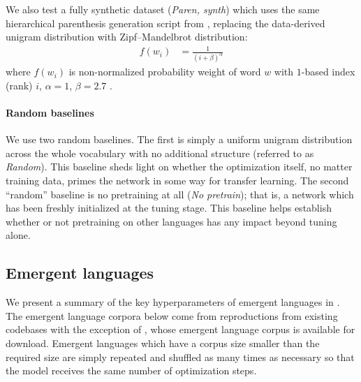 We also test a fully synthetic dataset (\emph{Paren, synth}) which uses the same hierarchical parenthesis generation script from \citet{Papadimitriou2020LearningMH}, replacing the data-derived unigram distribution with Zipf--Mandelbrot distribution:
\begin{align}
  f(w_i) &= \frac{1}{{(i+\beta)}^\alpha}
\end{align}
where $f(w_i)$ is non-normalized probability weight of word $w$ with $1$-based index (rank) $i$, $\alpha=1$, $\beta=2.7$ \citep{mandelbrot1953informational,piantadosi2014zipf}.


\paragraph{Random baselines}

We use two random baselines.
The first is simply a uniform unigram distribution across the whole vocabulary with no additional structure (referred to as \emph{Random}).
This baseline sheds light on whether the optimization itself, no matter training data, primes the network in some way for transfer learning.
The second ``random'' baseline is no pretraining at all (\emph{No pretrain}); that is, a network which has been freshly initialized at the tuning stage.
This baseline helps establish whether or not pretraining on other languages has any impact beyond tuning alone.


\subsection{Emergent languages}
\unskip\label{sec:em-langs}

We present a summary of the key hyperparameters of emergent languages in .
The emergent language corpora below come from reproductions from existing codebases with the exception of \citet{yao2022linking}, whose emergent language corpus is available for download.
Emergent languages which have a corpus size smaller than the required size are simply repeated and shuffled as many times as necessary so that the model receives the same number of optimization steps.

